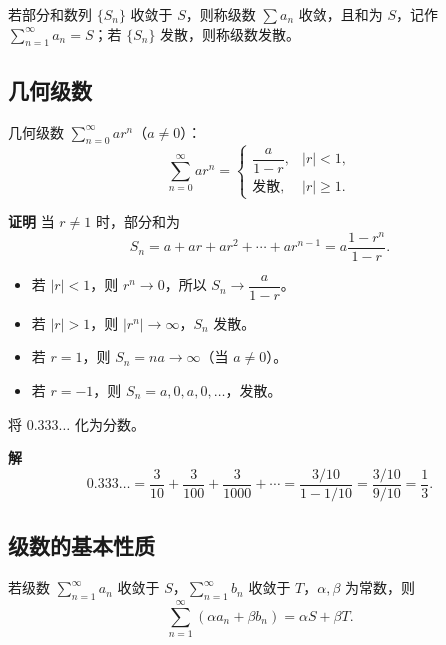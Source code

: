 \documentclass{ctexart}
\newenvironment{custom}[1]{\par\noindent \textbf{#1}\quad}{\par\vspace{1em}}
\begin{document}
\begin{example}[加减结构中的错误示例]
\begin{definition}[级数收敛与发散]
若部分和数列 \(\{S_n\}\) 收敛于 \(S\)，则称级数 \(\sum a_n\) 收敛，且和为 \(S\)，记作 \(\sum_{n=1}^{\infty} a_n = S\)；若 \(\{S_n\}\) 发散，则称级数发散。
\end{definition}

\subsection{几何级数}

\begin{theorem}[几何级数]
几何级数 \(\sum_{n=0}^{\infty} ar^n\)（\(a \neq 0\)）：
\[
\sum_{n=0}^{\infty} ar^n = 
\begin{cases}
\dfrac{a}{1-r}, & |r| < 1,\\[6pt]
\text{发散}, & |r| \geq 1.
\end{cases}
\]
\end{theorem}

\begin{custom}{证明}
当 \(r \neq 1\) 时，部分和为
\[
S_n = a + ar + ar^2 + \cdots + ar^{n-1} = a\dfrac{1-r^n}{1-r}.
\]
\begin{itemize}
\item 若 \(|r| < 1\)，则 \(r^n \to 0\)，所以 \(S_n \to \dfrac{a}{1-r}\)。
\item 若 \(|r| > 1\)，则 \(|r^n| \to \infty\)，\(S_n\) 发散。
\item 若 \(r = 1\)，则 \(S_n = na \to \infty\)（当 \(a \neq 0\)）。
\item 若 \(r = -1\)，则 \(S_n = a, 0, a, 0, \dots\)，发散。
\end{itemize}
\end{custom}

\begin{example}[应用：循环小数化分数]
将 \(0.333\ldots\) 化为分数。
\end{example}
\begin{custom}{解}
\[
0.333\ldots = \dfrac{3}{10} + \dfrac{3}{100} + \dfrac{3}{1000} + \cdots = \dfrac{3/10}{1-1/10} = \dfrac{3/10}{9/10} = \dfrac{1}{3}.
\]
\end{custom}

\subsection{级数的基本性质}

\begin{theorem}[级数的线性性质]
若级数 \(\sum_{n=1}^{\infty} a_n\) 收敛于 \(S\)，\(\sum_{n=1}^{\infty} b_n\) 收敛于 \(T\)，\(\alpha, \beta\) 为常数，则
\[
\sum_{n=1}^{\infty} (\alpha a_n + \beta b_n) = \alpha S + \beta T.
\]
\end{theorem}


\end{example}
\end{document}
